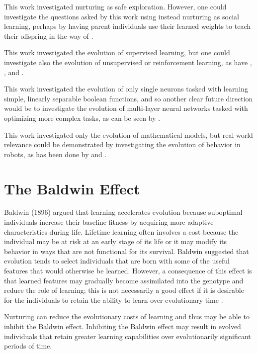 \documentclass[master]{outhesis}
\begin{document}
This work investigated nurturing as safe exploration.
However, one could investigate the questions asked by this work using instead nurturing as social learning,
perhaps by having parent individuals use their learned weights to teach their offspring in the way of \citet{McQuesten:1997aa}.

This work investigated the evolution of supervised learning,
but one could investigate also the evolution of unsupervised or reinforcement learning,
as have \citet{McQuesten:1997aa}, \citet{Niv:2002aa}, and \citet{Shah:2015hs}.

This work investigated the evolution of only single neurons tasked with learning simple, linearly separable boolean functions,
and so another clear future direction would be to investigate the evolution of multi-layer neural networks tasked with optimizing more complex tasks,
as can be seen by \citet{Shah:2015hs}.

This work investigated only the evolution of mathematical models,
but real-world relevance could be demonstrated by investigating the evolution of behavior in robots,
as has been done by \citet{Niv:2002aa} and \citet{Leonce:2012aa}.

\section{The Baldwin Effect}

Baldwin (1896) argued that learning accelerates evolution because suboptimal individuals increase their baseline fitness by acquiring more adaptive characteristics during life. 
Lifetime learning often involves a cost because the individual may be at risk at an early stage of its life or it may modify its behavior in ways that are not functional for its survival.
Baldwin suggested that evolution tends to select individuals that are born with some of the useful features that would otherwise be learned.
However, a consequence of this effect is that learned features may gradually become assimilated into the genotype and reduce the role of learning;
this is not necessarily a good effect if it is desirable for the individuals to retain the ability to learn over evolutionary time \citep{Floreano:2008wv}.

Nurturing can reduce the evolutionary costs of learning and thus may be able to inhibit the Baldwin effect.
Inhibiting the Baldwin effect may result in evolved individuals that retain greater learning capabilities over evolutionarily significant periods of time.

{}


\makebackmatter
\end{document}
